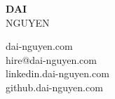 \documentclass[letterpage]{article}
\begin{document}
\thispagestyle{empty} %
\begin{minipage}[]{0.4\linewidth}
\raggedright
\textbf{\fontsize{37px}{1px}\selectfont\textsf{DAI}}\\
\vspace{7px}
{\fontsize{37px}{1px}\selectfont\textsf{NGUYEN}}
\end{minipage}
\begin{minipage}{0.01\linewidth}
\end{minipage}
\:\:\:\:\:\:\:\:\:\:\:\:\:\:\:\:\:\: %
\begin{minipage}{0.55\linewidth}
\raggedleft
\vspace{5px} %
dai-nguyen.com\enspace\faGlobe\\
hire@dai-nguyen.com\enspace\faPaperPlane\\
linkedin.dai-nguyen.com\enspace\faLinkedin\\
github.dai-nguyen.com\enspace\faGithubAlt
\end{minipage}
\vspace{11px}\\
\end{document}
